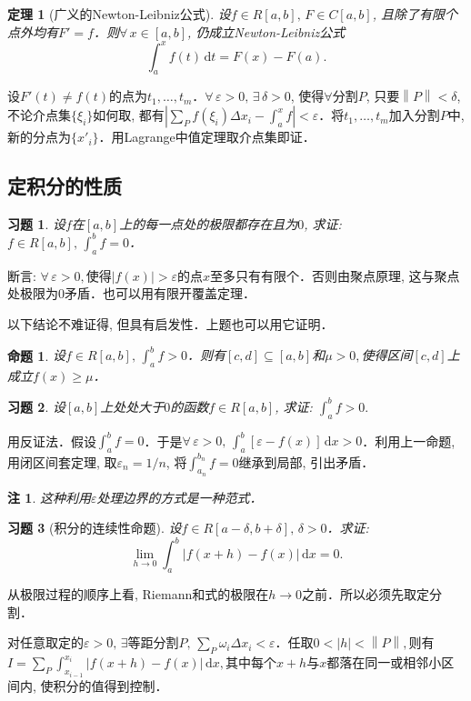 \documentclass[11pt,a4paper]{ctexart}
\makeatletter
\theoremstyle{thmseries} %
\newtheorem{thm}{定理}[section]
\newtheorem{prop}{命题}[section]
\theoremstyle{exerseries}
\newtheorem{exer}{习题}[section]
\newtheorem*{rem}{注}
\renewenvironment{proof}[1][\proofname]{\par
  \pushQED{\qed}%
  \normalfont \topsep6\p@\@plus6\p@\relax
  \trivlist
  \item[\hskip\labelsep
        \itshape
    #1\@addpunct{}]\ignorespaces
}{%
  \popQED\endtrivlist\@endpefalse
}
\newenvironment{pf}{\begin{proof}[\bfseries\upshape 证\quad]}{\end{proof}}
\renewcommand{\epsilon}{\varepsilon}
\renewcommand{\d}{\mathrm{d}}
\newcommand{\norm}[1]{\left\lVert#1\right\rVert}
\makeatother
\begin{document}
\begin{thm}[广义的Newton-Leibniz公式]
	设$f\in R[a,b],\,F\in C[a,b]$, 且除了有限个点外均有$F'=f$．则$\forall\,x\in[a,b]$, 仍成立Newton-Leibniz公式
	\[\int_{a}^{x}f(t)\,\d t=F(x)-F(a).\]
\end{thm}
\begin{pf}
	设$F'(t)\neq f(t)$的点为$t_1,\dots,t_m$．$\forall\,\epsilon>0,\,\exists\,\delta>0$, 使得$\forall$分割$P$, 只要$\norm{P}<\delta$, 不论介点集$\{\xi_i\}$如何取, 都有$\left|\sum_P f(\xi_i)\Delta x_i-\int_{a}^{x}f\right|<\epsilon$．将$t_1,\dots,t_m$加入分割$P$中, 新的分点为$\{x'_i\}$．用Lagrange中值定理取介点集即证．
\end{pf}


\subsection{定积分的性质}
\begin{exer}
	设$f$在$[a,b]$上的每一点处的极限都存在且为$0$, 求证: $f\in R[a,b],\,\int_{a}^{b}f=0$．
\end{exer}
\begin{pf}
	断言: $\forall\,\epsilon>0,$使得$|f(x)|>\epsilon$的点$x$至多只有有限个．否则由聚点原理, 这与聚点处极限为0矛盾．也可以用有限开覆盖定理．
\end{pf}

以下结论不难证得, 但具有启发性．上题也可以用它证明．
\begin{prop}
	设$f\in R[a,b],\,\int_{a}^{b}f>0$．则有$[c,d]\subseteq[a,b]$和$\mu>0,$使得区间$[c,d]$上成立$f(x)\geq\mu$．
\end{prop}

\begin{exer}
	设$[a,b]$上处处大于$0$的函数$f\in R[a,b]$, 求证: $\int_{a}^{b}f>0.$
\end{exer}
\begin{pf}
	用反证法．假设$\int_{a}^{b}f=0$．于是$\forall\,\epsilon>0,\,\int_{a}^{b}[\epsilon-f(x)]\,\d x>0$．利用上一命题, 用闭区间套定理, 取$\epsilon_n=1/n$, 将$\int_{a_n}^{b_n}f=0$继承到局部, 引出矛盾．
\end{pf}
\begin{rem}
	这种利用$\epsilon$处理边界的方式是一种范式．
\end{rem}

\begin{exer}[积分的连续性命题]
	设$f\in R[a-\delta,b+\delta],\,\delta>0$．求证: 
	\[\lim_{h\to0}\int_{a}^{b}|f(x+h)-f(x)|\,\d x=0.\]
\end{exer}
\begin{pf}
	从极限过程的顺序上看, Riemann和式的极限在$h\to0$之前．所以必须先取定分割．
	
	对任意取定的$\epsilon>0,\,\exists$等距分割$P,\,\sum_P \omega_i\Delta x_i<\epsilon$．任取$0<|h|<\norm{P},$则有
	$I=\sum_P \int_{x_{i-1}}^{x_i}|f(x+h)-f(x)|\,\d x,$其中每个$x+h$与$x$都落在同一或相邻小区间内, 使积分的值得到控制．
\end{pf}
\end{document}
